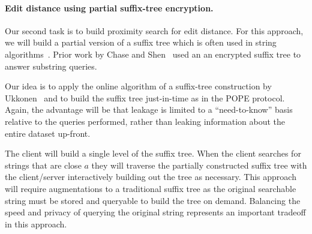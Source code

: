 \paragraph{Edit distance using partial suffix-tree encryption.}
Our second task is to build proximity search for edit distance.  For this
approach, we will build a partial version of a suffix tree which is often used
in string algorithms~\cite{mccreight1976space}.  Prior work by Chase and
Shen~\cite{chase2015substring} used an an encrypted suffix tree to answer
substring queries.

Our idea is to apply the online algorithm of a suffix-tree construction by
Ukkonen~\cite{Ukkonen95} and to build the suffix tree just-in-time as in
the POPE protocol. Again, the advantage will be that leakage is limited
to a ``need-to-know'' basis relative to the queries performed, rather
than leaking information about the entire dataset up-front.

The client will build a single level of the
suffix tree.  When the client searches for strings that are close $a$ they will
traverse the partially constructed suffix tree with the client/server
interactively building out the tree as necessary.  This approach will require
augmentations to a traditional suffix tree as the original searchable string
must be stored and queryable to build the tree on demand.  Balancing the speed
and privacy of querying the original string represents an important tradeoff in
this approach.
